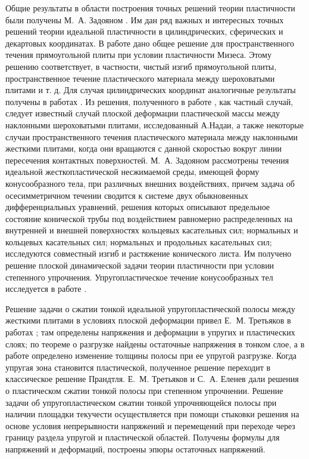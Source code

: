 Общие результаты в области построения точных решений теории пластичности были получены М.~А. Задояном \autocite{Zadoyan:1964a,Zadoyan:1964b,Zadoyan:1964c,Zadoyan:1964d,Zadoyan:1966a,Zadoyan:1966b,Zadoyan:1981,Zadoyan:1983a,Zadoyan:1983b}. Им дан ряд важных и интересных точных решений теории идеальной пластичности в цилиндрических, сферических и декартовых координатах. В работе \autocite{Zadoyan:1964b} дано общее решение для пространственного течения прямоугольной плиты при условии пластичности Мизеса. Этому решению соответствует, в частности, чистый изгиб прямоугольной плиты, пространственное течение пластического материала между шероховатыми плитами и т. д.
Для случая цилиндрических координат аналогичные результаты получены в работах \autocite{Zadoyan:1964a,Zadoyan:1964c}. Из решения, полученного в работе \autocite{Zadoyan:1964a}, как частный случай, следует известный случай плоской деформации пластической массы между наклонными шероховатыми плитами, исследованный А.Надаи, а также некоторые случаи пространственного течения пластического материала между наклонными жесткими плитами, когда они вращаются с данной скоростью вокруг линии пересечения контактных поверхностей. М.~А. Задояном \autocite{Zadoyan:1983b} рассмотрены течения идеальной жесткопластической несжимаемой среды, имеющей форму конусообразного тела, при различных внешних воздействиях, причем задача об осесимметричном течении сводится к системе двух обыкновенных дифференциальных уравнений, решения которых описывают предельное состояние конической трубы под воздействием равномерно распределенных на внутренней и внешней поверхностях кольцевых касательных сил; нормальных и кольцевых касательных сил; нормальных и продольных касательных сил; исследуются совместный изгиб и растяжение конического листа. Им \autocite{Zadoyan:1981, Zadoyan:1992} получено решение плоской динамической задачи теории пластичности при условии степенного упрочнения. Упругопластическое течение конусообразных тел исследуется в работе \autocite{Zadoyan:1983a}.

Решение задачи о сжатии тонкой идеальной упругопластической полосы между жесткими плитами в условиях плоской деформации привел Е.~М. Третьяков в работах \autocite{Tretyakov:1966a,Tretyakov:1973,Tretyakov:1965}; там определены напряжения и деформации в упругих и пластических слоях; по теореме о разгрузке найдены остаточные напряжения в тонком слое, а в работе \autocite{Tretyakov:1968} определено изменение толщины полосы при ее упругой разгрузке. Когда упругая зона становится пластической, полученное решение переходит в классическое решение Прандтля. Е.~М. Третьяков и С.~А. Еленев \autocite{Tretyakov:1966b,Tretyakov:1967} дали решения о пластическом сжатии тонкой полосы при степенном упрочнении.
Решение задачи об упругопластическом сжатии тонкой упрочняющейся полосы при наличии площадки текучести \autocite{Tretyakov:1974} осуществляется при помощи стыковки решения на основе условия непрерывности напряжений и перемещений при переходе через границу раздела упругой и пластической областей. Получены формулы для напряжений и деформаций, построены эпюры остаточных напряжений.

